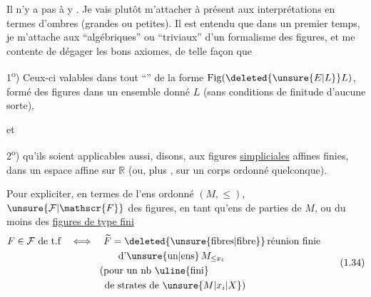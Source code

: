 
Il n'y a pas à y . Je vais plutôt m'attacher à présent aux interprétations en termes d'ombres (grandes ou petites). Il est entendu que dans un premier temps, je m'attache aux  ``algébriques'' ou ``triviaux'' d'un formalisme des figures, et me contente de dégager les bons axiomes, de telle façon que

1\textsuperscript{o}) Ceux-ci  valables dans tout ``'' de la forme $\mathrm{Fig}(\deleted{\unsure{E|L}}L)$, formé des figures  dans un ensemble donné $L$ (sans conditions de finitude d'aucune sorte),

et

2\textsuperscript{o}) qu'ils soient applicables aussi, disons, aux figures \uline{simpliciales} affines finies, dans un espace affine sur $\mathbb{R}$ (ou, plus , sur un corps ordonné quelconque).

Pour expliciter, en termes de l'ens ordonné $(M,\leq)$,  $\unsure{\mathcal{F}|\mathscr{F}}$ des figures, en tant qu'ens de parties de $M$,  ou du moins des \uline{figures de type fini}
\[
\begin{aligned}
 F\in\mathcal{F}\ \text{de t.f} \quad&\Longleftrightarrow\quad
 \widetilde F=\deleted{\unsure{\text{fibres}|\text{fibre}}}\,\text{réunion finie}\\
 &\hspace{4.9em}\text{d'\unsure{un|ens}}\,M_{\leq x_i}\\
 &\hspace{3.0em}\text{(pour un nb \uline{fini}}\\
 &\hspace{3.5em}\text{de strates de }\unsure{M|x_i|X}\text{)}
\end{aligned}
\tag*{(1.34)}
\]

